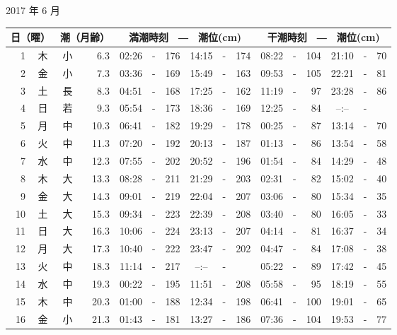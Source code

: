 \documentclass[12pt.a4j]{jsarticle}
\begin{document}
\begin{center}
 {\large 2017 年  6 月}\\
 \begin{table}[ht]
    \begin{tabular}{|rc|cr|ccrccr|ccrccr|}
    \hline
    \multicolumn{2}{|c|}{日（曜）} & \multicolumn{2}{c|}{潮（月齢）} & \multicolumn{6}{c|}{満潮時刻　―　潮位(cm)} & \multicolumn{6}{c|}{干潮時刻　―　潮位(cm)} \\
 \hline
 1 & 木 & 小 &  6.3 &  02:26 &-& 176  &  14:15 &-& 174  &   08:22 &-& 104  &   21:10 &-&  70  \\
 2 & 金 & 小 &  7.3 &  03:36 &-& 169  &  15:49 &-& 163  &   09:53 &-& 105  &   22:21 &-&  81  \\
 3 & 土 & 長 &  8.3 &  04:51 &-& 168  &  17:25 &-& 162  &   11:19 &-&  97  &   23:28 &-&  86  \\
 4 & 日 & 若 &  9.3 &  05:54 &-& 173  &  18:36 &-& 169  &   12:25 &-&  84  &   --:-- &-&     \\
 5 & 月 & 中 & 10.3 &  06:41 &-& 182  &  19:29 &-& 178  &   00:25 &-&  87  &   13:14 &-&  70  \\
 6 & 火 & 中 & 11.3 &  07:20 &-& 192  &  20:13 &-& 187  &   01:13 &-&  86  &   13:54 &-&  58  \\
 7 & 水 & 中 & 12.3 &  07:55 &-& 202  &  20:52 &-& 196  &   01:54 &-&  84  &   14:29 &-&  48  \\
 8 & 木 & 大 & 13.3 &  08:28 &-& 211  &  21:29 &-& 203  &   02:31 &-&  82  &   15:02 &-&  40  \\
 9 & 金 & 大 & 14.3 &  09:01 &-& 219  &  22:04 &-& 207  &   03:06 &-&  80  &   15:34 &-&  35  \\
10 & 土 & 大 & 15.3 &  09:34 &-& 223  &  22:39 &-& 208  &   03:40 &-&  80  &   16:05 &-&  33  \\
11 & 日 & 大 & 16.3 &  10:06 &-& 224  &  23:13 &-& 207  &   04:14 &-&  81  &   16:37 &-&  34  \\
12 & 月 & 大 & 17.3 &  10:40 &-& 222  &  23:47 &-& 202  &   04:47 &-&  84  &   17:08 &-&  38  \\
13 & 火 & 中 & 18.3 &  11:14 &-& 217  &  --:-- &-&     &   05:22 &-&  89  &   17:42 &-&  45  \\
14 & 水 & 中 & 19.3 &  00:22 &-& 195  &  11:51 &-& 208  &   05:58 &-&  95  &   18:19 &-&  55  \\
15 & 木 & 中 & 20.3 &  01:00 &-& 188  &  12:34 &-& 198  &   06:41 &-& 100  &   19:01 &-&  65  \\
16 & 金 & 小 & 21.3 &  01:43 &-& 181  &  13:27 &-& 186  &   07:36 &-& 104  &   19:53 &-&  77  \\

\end{tabular}
\end{table}
\end{center}
\end{document}
